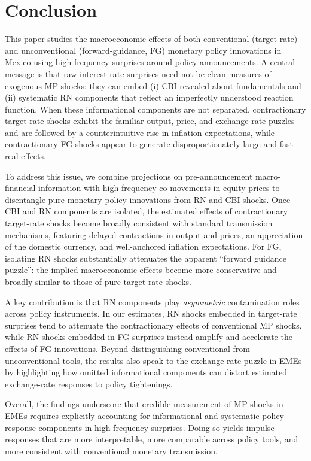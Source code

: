 \documentclass[\latexroot/\projectname]{subfiles}
\begin{document}
\section{Conclusion}
\whenintegrated{\label{sec:conclusion}}

This paper studies the macroeconomic effects of both conventional (target-rate) and unconventional (forward-guidance, FG) monetary policy innovations in Mexico using high-frequency surprises around policy announcements. A central message is that raw interest rate surprises need not be clean measures of exogenous MP shocks: they can embed (i) CBI revealed about fundamentals and (ii) systematic RN components that reflect an imperfectly understood reaction function. When these informational components are not separated, contractionary target-rate shocks exhibit the familiar output, price, and exchange-rate puzzles and are followed by a counterintuitive rise in inflation expectations, while contractionary FG shocks appear to generate disproportionately large and fast real effects.

To address this issue, we combine projections on pre-announcement macro-financial information with high-frequency co-movements in equity prices to disentangle pure monetary policy innovations from RN and CBI shocks. Once CBI and RN components are isolated, the estimated effects of contractionary target-rate shocks become broadly consistent with standard transmission mechanisms, featuring delayed contractions in output and prices, an appreciation of the domestic currency, and well-anchored inflation expectations. For FG, isolating RN shocks substantially attenuates the apparent “forward guidance puzzle”: the implied macroeconomic effects become more conservative and broadly similar to those of pure target-rate shocks.

A key contribution is that RN components play \emph{asymmetric} contamination roles across policy instruments. In our estimates, RN shocks embedded in target-rate surprises tend to attenuate the contractionary effects of conventional MP shocks, while RN shocks embedded in FG surprises instead amplify and accelerate the effects of FG innovations. Beyond distinguishing conventional from unconventional tools, the results also speak to the exchange-rate puzzle in EMEs by highlighting how omitted informational components can distort estimated exchange-rate responses to policy tightenings.

Overall, the findings underscore that credible measurement of MP shocks in EMEs requires explicitly accounting for informational and systematic policy-response components in high-frequency surprises. Doing so yields impulse responses that are more interpretable, more comparable across policy tools, and more consistent with conventional monetary transmission.

\smartbib

\pdfonly{
  \captionsetup[figure]{list=no}
  \captionsetup[table]{list=no}
}
\end{document}
